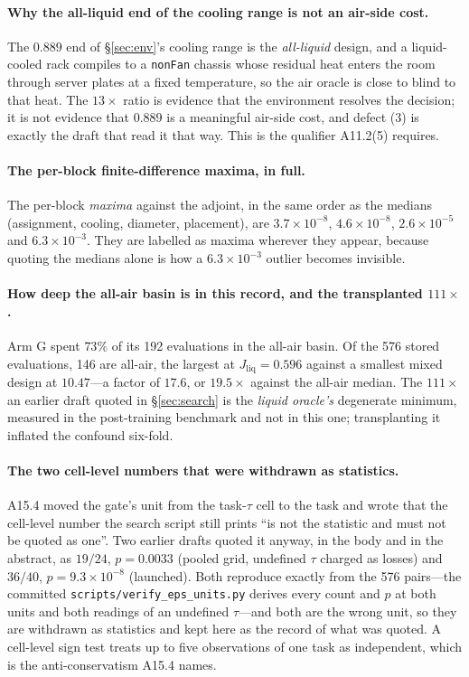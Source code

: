 \documentclass{article}
\newcommand{\Jliq}{J_{\mathrm{liq}}}
\begin{document}
\paragraph{Why the all-liquid end of the cooling range is not an air-side cost.}
The $0.889$ end of \S\ref{sec:env}'s cooling range is the \emph{all-liquid} design, and a
liquid-cooled rack compiles to a \texttt{nonFan} chassis whose residual heat enters the room
through server plates at a fixed temperature, so the air oracle is close to blind to that
heat.  The $13\times$ ratio is evidence that the environment resolves the decision; it is not
evidence that $0.889$ is a meaningful air-side cost, and defect (3) is exactly the draft that
read it that way.  This is the qualifier A11.2(5) requires.

\paragraph{The per-block finite-difference maxima, in full.}
The per-block \emph{maxima} against the adjoint, in the same order as the medians
(assignment, cooling, diameter, placement), are $3.7\times10^{-8}$, $4.6\times10^{-8}$,
$2.6\times10^{-5}$ and $6.3\times10^{-3}$.  They are labelled as maxima wherever they appear,
because quoting the medians alone is how a $6.3\times10^{-3}$ outlier becomes invisible.

\paragraph{How deep the all-air basin is in this record, and the transplanted $111\times$.}
Arm G spent $73\%$ of its 192 evaluations in the all-air basin.  Of the 576 stored
evaluations, 146 are all-air, the largest at $\Jliq = 0.596$ against a smallest mixed design
at $10.47$---a factor of $17.6$, or $19.5\times$ against the all-air median.  The
$111\times$ an earlier draft quoted in \S\ref{sec:search} is the \emph{liquid oracle's}
degenerate minimum, measured in the post-training benchmark and not in this one; transplanting
it inflated the confound six-fold.

\paragraph{The two cell-level numbers that were withdrawn as statistics.}
A15.4 moved the gate's unit from the task-$\tau$ cell to the task and wrote that the
cell-level number the search script still prints ``is not the statistic and must not be quoted
as one''.  Two earlier drafts quoted it anyway, in the body and in the abstract, as $19/24$,
$p = 0.0033$ (pooled grid, undefined $\tau$ charged as losses) and $36/40$,
$p = 9.3\times10^{-8}$ (launched).  Both reproduce exactly from the 576 pairs---the committed
\texttt{scripts/verify\_eps\_units.py} derives every count and $p$ at both units and both
readings of an undefined $\tau$---and both are the wrong unit, so they are withdrawn as
statistics and kept here as the record of what was quoted.  A cell-level sign test treats up to
five observations of one task as independent, which is the anti-conservatism A15.4 names.
\end{document}
